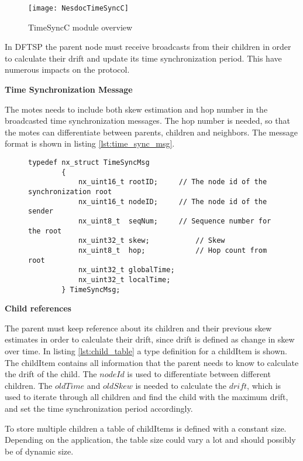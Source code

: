 \documentclass[Main]{subfiles}
\begin{document}
				\begin{figure}[H]
					\centering
					\texttt{[image: NesdocTimeSyncC]}
					\caption{TimeSyncC module overview}
					\label{fig:nesdoc_time_sync_c}
				\end{figure}

				In DFTSP the parent node must receive broadcasts from their children in order to calculate their drift and update its time synchronization period.
				This have numerous impacts on the protocol.

				\textbf{Time Synchronization Message}
				
					The motes needs to include both skew estimation and hop number in the broadcasted time synchronization messages. 
					The hop number is needed, so that the motes can differentiate between parents, children and neighbors. 
					The message format is shown in listing \ref{lst:time_sync_msg}.
					\begin{figure}[H]
						\begin{lstlisting}[caption=TimeSyncMsg, style=Code-C, label=lst:time_sync_msg]
		typedef nx_struct TimeSyncMsg
		{
			nx_uint16_t	rootID;		// The node id of the synchronization root
			nx_uint16_t	nodeID;		// The node id of the sender
			nx_uint8_t	seqNum;		// Sequence number for the root
			nx_uint32_t skew;			// Skew 
			nx_uint8_t  hop;			// Hop count from root
			nx_uint32_t	globalTime;
			nx_uint32_t localTime;
		} TimeSyncMsg;
						\end{lstlisting}
					\end{figure}
			
				
				\textbf{Child references}


					The parent must keep reference about its children and their previous skew estimates in order to calculate their drift, since drift is defined as change in skew over time.
					In listing \ref{lst:child_table} a type definition for a childItem is shown. 
					The childItem contains all information that the parent needs to know to calculate the drift of the child.
					The $nodeId$ is used to differentiate between different children.
					The $oldTime$ and $oldSkew$ is needed to calculate the $drift$, which is used to iterate through all children and find the child with the maximum drift, and set the time synchronization period accordingly.

					To store multiple children a table of childItems is defined with a constant size. Depending on the application, the table size could vary a lot and should possibly be of dynamic size.
\end{document}
